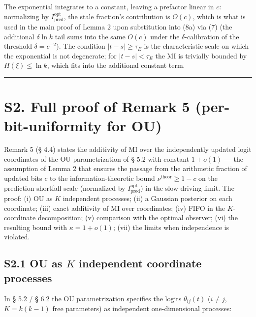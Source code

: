 \documentclass[pdflatex,sn-mathphys-ay]{sn-jnl}
\begin{document}
The exponential integrates to a constant, leaving a prefactor linear in \(c\): normalizing by \(I_{\text{pred}}^{\text{opt}}\), the stale fraction's contribution is \(O(c)\), which is what is used in the main proof of Lemma 2 upon substitution into (8a) via (7) (the additional \(\delta\ln k\) tail sums into the same \(O(c)\) under the \(\delta\)-calibration of the threshold \(\delta = e^{-2}\)). The condition \(|t-s| \ge \tau_E\) is the characteristic scale on which the exponential is not degenerate; for \(|t-s| < \tau_E\) the MI is trivially bounded by \(H(\xi) \le \ln k\), which fits into the additional constant term.



\begin{center}\rule{0.5\linewidth}{0.5pt}\end{center}



\section*{S2. Full proof of Remark 5 (per-bit-uniformity for OU)}\label{s2.-full-proof-of-remark-5-per-bit-uniformity-for-ou}



Remark 5 (§ 4.4) states the additivity of MI over the independently updated logit coordinates of the OU parametrization of § 5.2 with constant \(1 + o(1)\) --- the assumption of Lemma 2 that ensures the passage from the arithmetic fraction of updated bits \(c\) to the information-theoretic bound \(\nu^{\text{theor}} \ge 1 - c\) on the prediction-shortfall scale (normalized by \(I_{\text{pred}}^{\text{opt}}\)) in the slow-driving limit. The proof: (i) OU as \(K\) independent processes; (ii) a Gaussian posterior on each coordinate; (iii) exact additivity of MI over coordinates; (iv) FIFO in the \(K\)-coordinate decomposition; (v) comparison with the optimal observer; (vi) the resulting bound with \(\kappa = 1 + o(1)\); (vii) the limits when independence is violated.



\subsection*{\texorpdfstring{S2.1 OU as \(K\) independent coordinate processes}{S2.1 OU as K independent coordinate processes}}\label{s2.1-ou-as-k-independent-coordinate-processes}



In § 5.2 / § 6.2 the OU parametrization specifies the logits \(\theta_{ij}(t)\) (\(i \ne j\), \(K = k(k-1)\) free parameters) as independent one-dimensional processes:
\end{document}
